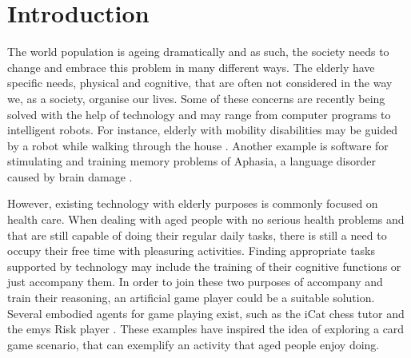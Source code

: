\section{Introduction} \label{introduction}

     The world population is ageing dramatically and as such, the society needs to change and embrace this problem in many different ways. The elderly have specific needs, physical and cognitive, that are often not considered in the way we, as a society, organise our lives.  
Some of these concerns are recently being solved with the help of technology and may range from computer programs to intelligent robots.
For instance, elderly with mobility disabilities may be guided by a robot while walking through the house \cite{Pollack2002}.
Another example is software for stimulating and training memory problems of Aphasia, a language disorder caused by brain damage \cite{Pompili2011}.

However, existing technology with elderly purposes is commonly focused on health care.
When dealing with aged people with no serious health problems and that are still capable of doing their regular daily tasks, there is still a need to occupy their free time with pleasuring activities.
Finding appropriate tasks supported by technology may include the training of their cognitive functions or just accompany them.
In order to join these two purposes of accompany and train their reasoning, an artificial game player could be a suitable solution.
Several embodied agents for game playing exist, such as the iCat chess tutor \cite{Affective2007} and the \gls{emys} Risk player \cite{Pereira}.%
These examples have inspired the idea of exploring a card game scenario, that can exemplify an activity that aged people enjoy doing.

